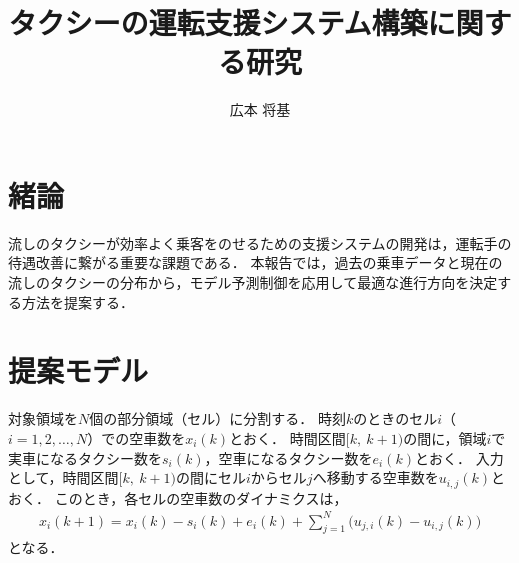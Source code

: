 \documentclass[a4j,9pt,twocolumn]{paper}
\title{タクシーの運転支援システム構築に関する研究}	%
\author{広本 将基}		%
\begin{document}
\absttitle		%

\section{緒論}
流しのタクシーが効率よく乗客をのせるための支援システムの開発は，運転手の待遇改善に繋がる重要な課題である．
本報告では，過去の乗車データと現在の流しのタクシーの分布から，モデル予測制御を応用して最適な進行方向を決定する方法を提案する．

\section{提案モデル}
対象領域を$N$個の部分領域（セル）に分割する．
時刻$k$のときのセル$i$（$i = 1, 2, \ldots, N$）での空車数を$x_i(k)$とおく．
時間区間$[k,\ k+1)$の間に，領域$i$で実車になるタクシー数を$s_i(k)$，空車になるタクシー数を$e_i(k)$とおく．
入力として，時間区間$[k,\ k+1)$の間にセル$i$からセル$j$へ移動する空車数を$u_{i, j}(k)$とおく．
このとき，各セルの空車数のダイナミクスは，
\begin{align}
 x_i(k+1) = x_i(k)-s_i(k)+e_i(k)+\sum_{j=1}^{N}\bigg(u_{j,i}(k)-u_{i,j}(k) \bigg) \label{eq:x}
\end{align}
となる．
\end{document}
